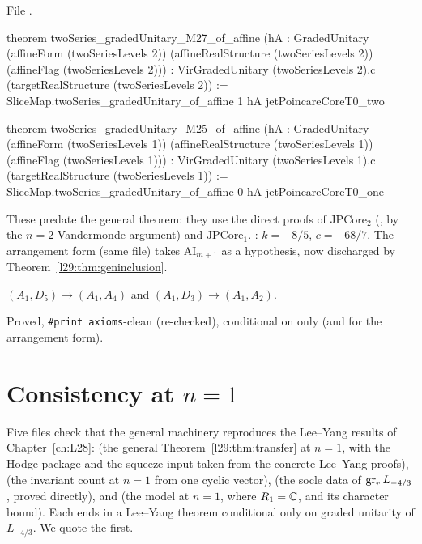 \noindent File .
\begin{leancode}
theorem twoSeries_gradedUnitary_M27_of_affine
    (hA : GradedUnitary (affineForm (twoSeriesLevels 2))
      (affineRealStructure (twoSeriesLevels 2)) (affineFlag (twoSeriesLevels 2))) :
    VirGradedUnitary (twoSeriesLevels 2).c (targetRealStructure (twoSeriesLevels 2)) :=
  SliceMap.twoSeries_gradedUnitary_of_affine 1 hA jetPoincareCoreT0_two

theorem twoSeries_gradedUnitary_M25_of_affine
    (hA : GradedUnitary (affineForm (twoSeriesLevels 1))
      (affineRealStructure (twoSeriesLevels 1)) (affineFlag (twoSeriesLevels 1))) :
    VirGradedUnitary (twoSeriesLevels 1).c (targetRealStructure (twoSeriesLevels 1)) :=
  SliceMap.twoSeries_gradedUnitary_of_affine 0 hA jetPoincareCoreT0_one
\end{leancode}

\begin{dictionary}
These predate the general theorem: they use the direct proofs of $\mathrm{JPCore}_2$ (,
by the $n=2$ Vandermonde argument) and $\mathrm{JPCore}_1$. : $k=-8/5$, $c=-68/7$. The arrangement
form  (same file) takes $\mathrm{AI}_{m+1}$ as a hypothesis, now
discharged by Theorem~\ref{l29:thm:geninclusion}.
\end{dictionary}

\begin{physics}
$(A_1,D_5)\to(A_1,A_4)$ and $(A_1,D_3)\to(A_1,A_2)$.
\end{physics}

\begin{status}
Proved, \texttt{\#print axioms}-clean (re-checked), conditional on  only (and  for the arrangement
form).
\end{status}

\section{Consistency at \texorpdfstring{$n=1$}{n=1}}\label{l29:sec:leeyang}

Five files check that the general machinery reproduces the Lee--Yang results of Chapter~\ref{ch:L28}:
 (the general Theorem~\ref{l29:thm:transfer} at $n=1$, with the Hodge package and the squeeze
input taken from the concrete Lee--Yang proofs),  (the invariant count at $n=1$ from one
cyclic vector),  (the socle data of $\operatorname{gr}_rL_{-4/3}$, proved directly),
 and  (the model at $n=1$, where $R_1={\mathbb{C}}$, and its
character bound). Each ends in a Lee--Yang theorem conditional only on graded unitarity of $L_{-4/3}$. We quote the first.

